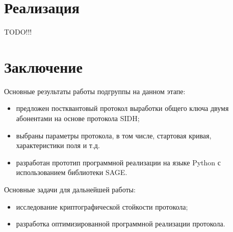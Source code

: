 \documentclass[a4paper,12pt]{article}
\theoremstyle{definition}
\begin{document}


\section{Реализация}

TODO!!!

\section*{Заключение}

Основные результаты работы подгруппы на данном этапе:

\begin{itemize}
 \item  предложен постквантовый протокол выработки общего ключа двумя абонентами на основе протокола SIDH;

 \item  выбраны параметры протокола, в том числе, стартовая кривая, характеристики поля и т.д.

 \item  разработан прототип программной реализации на языке Python с использованием библиотеки SAGE.
\end{itemize}


Основные задачи для дальнейшей работы:
\begin{itemize}

 \item  исследование криптографической стойкости протокола;

 \item  разработка оптимизированной программной реализации протокола.
\end{itemize}

\newpage
\end{document}
